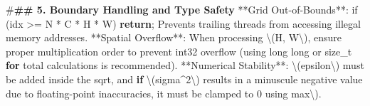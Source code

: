 \documentclass[
  10
]{article}
\newenvironment{Shaded}{}{}
\newcommand{\ControlFlowTok}[1]{\textcolor[rgb]{0.00,0.44,0.13}{\textbf{#1}}}
\newcommand{\DecValTok}[1]{\textcolor[rgb]{0.25,0.63,0.44}{#1}}
\newcommand{\ErrorTok}[1]{\textcolor[rgb]{1.00,0.00,0.00}{\textbf{#1}}}
\newcommand{\NormalTok}[1]{#1}
\newcommand{\OperatorTok}[1]{\textcolor[rgb]{0.40,0.40,0.40}{#1}}
\newcommand{\PreprocessorTok}[1]{\textcolor[rgb]{0.74,0.48,0.00}{#1}}
\begin{document}
\begin{Shaded}
\begin{Highlighting}[]
\PreprocessorTok{\#}\ErrorTok{\#\# 5. Boundary Handling and Type Safety}
\OperatorTok{**}\NormalTok{Grid Out}\OperatorTok{{-}}\NormalTok{of}\OperatorTok{{-}}\NormalTok{Bounds}\OperatorTok{**:}\NormalTok{ \textasciigrave{}if }\OperatorTok{(}\NormalTok{idx }\OperatorTok{\textgreater{}=}\NormalTok{ N }\OperatorTok{*}\NormalTok{ C }\OperatorTok{*}\NormalTok{ H }\OperatorTok{*}\NormalTok{ W}\OperatorTok{)} \ControlFlowTok{return}\OperatorTok{;}\NormalTok{\textasciigrave{} Prevents trailing threads from accessing illegal memory addresses}\OperatorTok{.}
\OperatorTok{**}\NormalTok{Spatial Overflow}\OperatorTok{**:}\NormalTok{ When processing \textbackslash{}}\OperatorTok{(}\NormalTok{H}\OperatorTok{,}\NormalTok{ W\textbackslash{}}\OperatorTok{),}\NormalTok{ ensure proper multiplication order to prevent \textasciigrave{}int32\textasciigrave{} overflow }\OperatorTok{(}\NormalTok{using \textasciigrave{}long long\textasciigrave{} or \textasciigrave{}size\_t\textasciigrave{} }\ControlFlowTok{for}\NormalTok{ total calculations is recommended}\OperatorTok{).}
\OperatorTok{**}\NormalTok{Numerical Stability}\OperatorTok{**:}\NormalTok{ \textbackslash{}}\OperatorTok{(}\NormalTok{epsilon\textbackslash{}}\OperatorTok{)}\NormalTok{ must be added inside the \textasciigrave{}sqrt\textasciigrave{}}\OperatorTok{,}\NormalTok{ and }\ControlFlowTok{if}\NormalTok{ \textbackslash{}}\OperatorTok{(}\NormalTok{sigma}\OperatorTok{\^{}}\DecValTok{2}\NormalTok{\textbackslash{}}\OperatorTok{)}\NormalTok{ results in a minuscule negative value due to floating}\OperatorTok{{-}}\NormalTok{point inaccuracies}\OperatorTok{,}\NormalTok{ it must be clamped to }\DecValTok{0}\NormalTok{ using \textasciigrave{}max\textbackslash{}}\OperatorTok{).}


\end{Highlighting}
\end{Shaded}
\end{document}
